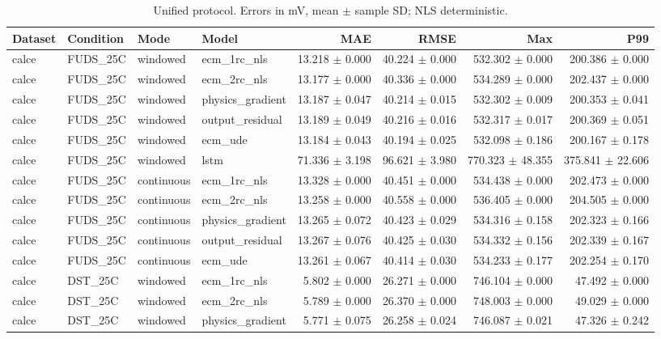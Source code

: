 \begin{longtable}{llllrrrr}
\caption{Unified protocol. Errors in mV, mean $\pm$ sample SD; NLS deterministic.}\\
Dataset & Condition & Mode & Model & MAE & RMSE & Max & P99 \\
\hline
calce & FUDS\_25C & windowed & ecm\_1rc\_nls & 13.218 $\pm$ 0.000 & 40.224 $\pm$ 0.000 & 532.302 $\pm$ 0.000 & 200.386 $\pm$ 0.000 \\
calce & FUDS\_25C & windowed & ecm\_2rc\_nls & 13.177 $\pm$ 0.000 & 40.336 $\pm$ 0.000 & 534.289 $\pm$ 0.000 & 202.437 $\pm$ 0.000 \\
calce & FUDS\_25C & windowed & physics\_gradient & 13.187 $\pm$ 0.047 & 40.214 $\pm$ 0.015 & 532.302 $\pm$ 0.009 & 200.353 $\pm$ 0.041 \\
calce & FUDS\_25C & windowed & output\_residual & 13.189 $\pm$ 0.049 & 40.216 $\pm$ 0.016 & 532.317 $\pm$ 0.017 & 200.369 $\pm$ 0.051 \\
calce & FUDS\_25C & windowed & ecm\_ude & 13.184 $\pm$ 0.043 & 40.194 $\pm$ 0.025 & 532.098 $\pm$ 0.186 & 200.167 $\pm$ 0.178 \\
calce & FUDS\_25C & windowed & lstm & 71.336 $\pm$ 3.198 & 96.621 $\pm$ 3.980 & 770.323 $\pm$ 48.355 & 375.841 $\pm$ 22.606 \\
calce & FUDS\_25C & continuous & ecm\_1rc\_nls & 13.328 $\pm$ 0.000 & 40.451 $\pm$ 0.000 & 534.438 $\pm$ 0.000 & 202.473 $\pm$ 0.000 \\
calce & FUDS\_25C & continuous & ecm\_2rc\_nls & 13.258 $\pm$ 0.000 & 40.558 $\pm$ 0.000 & 536.405 $\pm$ 0.000 & 204.505 $\pm$ 0.000 \\
calce & FUDS\_25C & continuous & physics\_gradient & 13.265 $\pm$ 0.072 & 40.423 $\pm$ 0.029 & 534.316 $\pm$ 0.158 & 202.323 $\pm$ 0.166 \\
calce & FUDS\_25C & continuous & output\_residual & 13.267 $\pm$ 0.076 & 40.425 $\pm$ 0.030 & 534.332 $\pm$ 0.156 & 202.339 $\pm$ 0.167 \\
calce & FUDS\_25C & continuous & ecm\_ude & 13.261 $\pm$ 0.067 & 40.414 $\pm$ 0.030 & 534.233 $\pm$ 0.177 & 202.254 $\pm$ 0.170 \\
calce & DST\_25C & windowed & ecm\_1rc\_nls & 5.802 $\pm$ 0.000 & 26.271 $\pm$ 0.000 & 746.104 $\pm$ 0.000 & 47.492 $\pm$ 0.000 \\
calce & DST\_25C & windowed & ecm\_2rc\_nls & 5.789 $\pm$ 0.000 & 26.370 $\pm$ 0.000 & 748.003 $\pm$ 0.000 & 49.029 $\pm$ 0.000 \\
calce & DST\_25C & windowed & physics\_gradient & 5.771 $\pm$ 0.075 & 26.258 $\pm$ 0.024 & 746.087 $\pm$ 0.021 & 47.326 $\pm$ 0.242 \\

\end{longtable}
